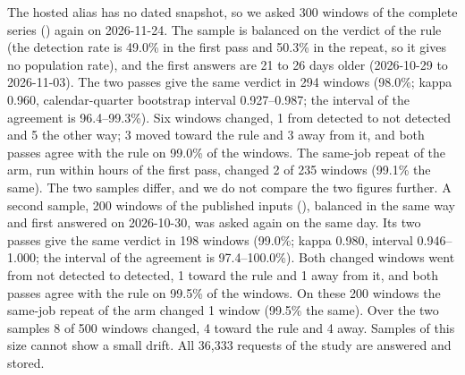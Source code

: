 The hosted alias has no dated snapshot, so we asked 300 windows of the complete series () again on 2026-11-24. The sample is balanced on the verdict of the rule (the detection rate is 49.0\% in the first pass and 50.3\% in the repeat, so it gives no population rate), and the first answers are 21 to 26 days older (2026-10-29 to 2026-11-03). The two passes give the same verdict in 294 windows (98.0\%; kappa 0.960, calendar-quarter bootstrap interval 0.927--0.987; the interval of the agreement is 96.4--99.3\%). Six windows changed, 1 from detected to not detected and 5 the other way; 3 moved toward the rule and 3 away from it, and both passes agree with the rule on 99.0\% of the windows. The same-job repeat of the arm, run within hours of the first pass, changed 2 of 235 windows (99.1\% the same). The two samples differ, and we do not compare the two figures further. A second sample, 200 windows of the published inputs (), balanced in the same way and first answered on 2026-10-30, was asked again on the same day. Its two passes give the same verdict in 198 windows (99.0\%; kappa 0.980, interval 0.946--1.000; the interval of the agreement is 97.4--100.0\%). Both changed windows went from not detected to detected, 1 toward the rule and 1 away from it, and both passes agree with the rule on 99.5\% of the windows. On these 200 windows the same-job repeat of the arm changed 1 window (99.5\% the same). Over the two samples 8 of 500 windows changed, 4 toward the rule and 4 away. Samples of this size cannot show a small drift. All 36{,}333 requests of the study are answered and stored.
